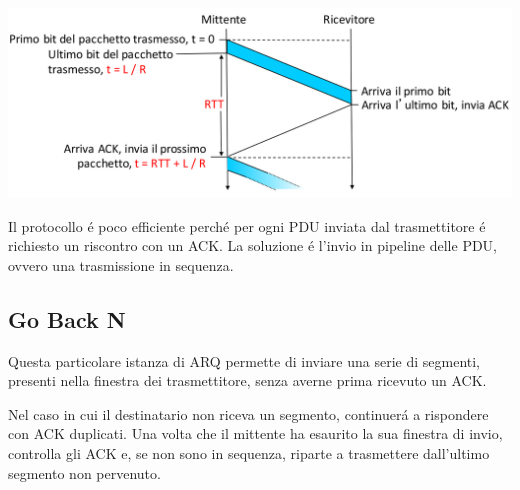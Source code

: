 \documentclass[12pt]{article}
\begin{document}
\begin{center}
	\includegraphics[scale=0.35]{livello_trasporto-img1.png}
\end{center}

Il protocollo \'e poco efficiente perch\'e per ogni PDU inviata dal trasmettitore \'e richiesto un riscontro con un 
ACK. La soluzione \'e l'invio in pipeline delle PDU, ovvero una trasmissione in sequenza.

\clearpage
\subsection{Go Back N}\label{arq-go-back-n}
Questa particolare istanza di ARQ permette di inviare una serie di segmenti, presenti nella finestra dei 
trasmettitore, senza averne prima ricevuto un ACK. 

Nel caso in cui il destinatario non riceva un segmento, continuer\'a a rispondere con ACK duplicati. Una volta che il 
mittente ha esaurito la sua finestra di invio, controlla gli ACK e, se non sono in sequenza, riparte a trasmettere 
dall'ultimo segmento non pervenuto.
\end{document}
